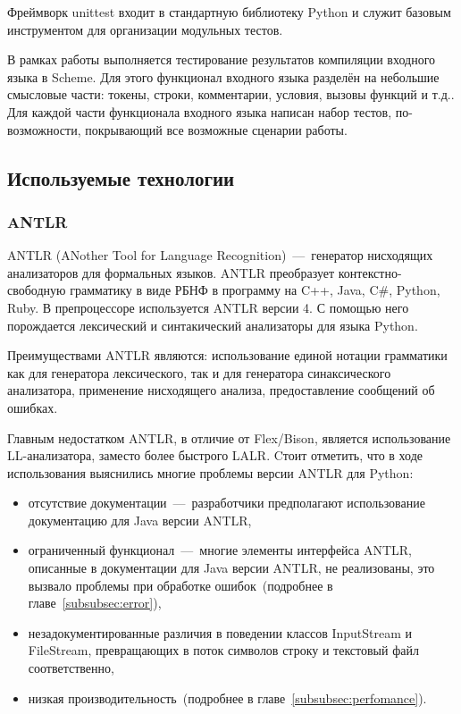 \documentclass[12pt,a4paper,oneside]{extarticle}
\begin{document}
            Фреймворк unittest входит в стандартную библиотеку Python и служит базовым инструментом для организации модульных тестов.

            В рамках работы выполняется тестирование результатов компиляции входного языка в Scheme.
            Для этого функционал входного языка разделён на небольшие смысловые части: токены, строки, комментарии, условия, вызовы функций и т.д..
            Для каждой части функционала входного языка написан набор тестов, по-возможности, покрывающий все возможные сценарии работы.
    \clearpage

    \subsection{Используемые технологии}
        \subsubsection{ANTLR}
            \label{subsec:antlr}
            ANTLR (ANother Tool for Language Recognition)~---~генератор нисходящих анализаторов для формальных языков.
            ANTLR преобразует контекстно-свободную грамматику в виде РБНФ в программу на C++, Java, C\#, Python, Ruby.
            В препроцессоре используется ANTLR версии 4.
            С помощью него порождается лексический и синтакический анализаторы для языка Python.

            Преимуществами ANTLR являются: использование единой нотации грамматики как для генератора лексического, так и для генератора синаксического анализатора, применение нисходящего анализа, предоставление сообщений об ошибках.

            Главным недостатком ANTLR, в отличие от Flex/Bison, является использование LL-анализатора, заместо более быстрого LALR.
            Cтоит отметить, что в ходе использования выяснились многие проблемы версии ANTLR для Python:
            \begin{itemize}
                \item отсутствие документации~---~разработчики предполагают использование документацию для Java версии ANTLR,
                \item ограниченный функционал~---~многие элементы интерфейса ANTLR, описанные в документации для Java версии ANTLR, не реализованы, это вызвало проблемы при обработке ошибок~(подробнее в главе~\ref{subsubsec:error}),
                \item незадокументированные различия в поведении классов InputStream и FileStream, превращающих в поток символов строку и текстовый файл соответственно,
                \item низкая производительность~(подробнее в главе~\ref{subsubsec:perfomance}).
            \end{itemize}
\end{document}
